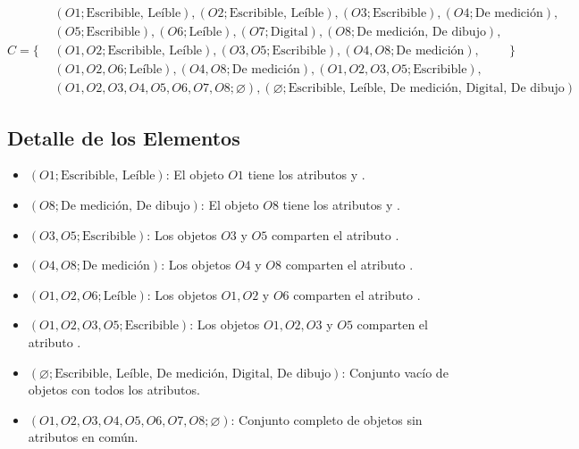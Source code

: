   \[
  C = \{
  \begin{aligned}
  & (O1; \text{Escribible, Leíble}), (O2; \text{Escribible, Leíble}), (O3; \text{Escribible}), (O4; \text{De medición}), \\
  & (O5; \text{Escribible}), (O6; \text{Leíble}), (O7; \text{Digital}), (O8; \text{De medición, De dibujo}), \\
  & (O1, O2; \text{Escribible, Leíble}), (O3, O5; \text{Escribible}), (O4, O8; \text{De medición}), \\
  & (O1, O2, O6; \text{Leíble}), (O4, O8; \text{De medición}), (O1, O2, O3, O5; \text{Escribible}), \\
  & (O1, O2, O3, O4, O5, O6, O7, O8; \varnothing), (\varnothing; \text{Escribible, Leíble, De medición, Digital, De dibujo})
  \end{aligned}
  \}
  \]
  
  \subsection{Detalle de los Elementos}
  \begin{itemize}
      \item \( (O1; \text{Escribible, Leíble}) \): El objeto \( O1 \) tiene los atributos  y .
      \item \( (O8; \text{De medición, De dibujo}) \): El objeto \( O8 \) tiene los atributos y .
      \item \( (O3, O5; \text{Escribible}) \): Los objetos \( O3 \) y \( O5 \) comparten el atributo .
      \item \( (O4, O8; \text{De medición}) \): Los objetos \( O4 \) y \( O8 \) comparten el atributo .
      \item \( (O1, O2, O6; \text{Leíble}) \): Los objetos \( O1, O2 \) y \( O6 \) comparten el atributo .
      \item \( (O1, O2, O3, O5; \text{Escribible}) \): Los objetos \( O1, O2, O3 \) y \( O5 \) comparten el atributo .
      \item \( (\varnothing; \text{Escribible, Leíble, De medición, Digital, De dibujo}) \): Conjunto vacío de objetos con todos los atributos.
      \item \( (O1, O2, O3, O4, O5, O6, O7, O8; \varnothing) \): Conjunto completo de objetos sin atributos en común.
  \end{itemize}
  

